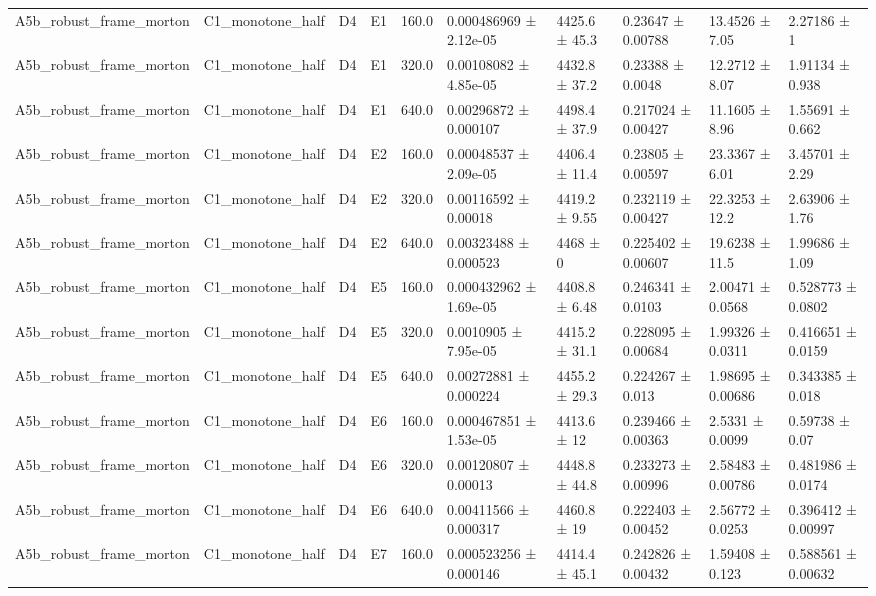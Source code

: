 \begin{table}
\begin{tabular}{llllllllll}
A5b\_robust\_frame\_morton & C1\_monotone\_half & D4 & E1 & 160.0 & 0.000486969 ± 2.12e-05 & 4425.6 ± 45.3 & 0.23647 ± 0.00788 & 13.4526 ± 7.05 & 2.27186 ± 1 \\
A5b\_robust\_frame\_morton & C1\_monotone\_half & D4 & E1 & 320.0 & 0.00108082 ± 4.85e-05 & 4432.8 ± 37.2 & 0.23388 ± 0.0048 & 12.2712 ± 8.07 & 1.91134 ± 0.938 \\
A5b\_robust\_frame\_morton & C1\_monotone\_half & D4 & E1 & 640.0 & 0.00296872 ± 0.000107 & 4498.4 ± 37.9 & 0.217024 ± 0.00427 & 11.1605 ± 8.96 & 1.55691 ± 0.662 \\
A5b\_robust\_frame\_morton & C1\_monotone\_half & D4 & E2 & 160.0 & 0.00048537 ± 2.09e-05 & 4406.4 ± 11.4 & 0.23805 ± 0.00597 & 23.3367 ± 6.01 & 3.45701 ± 2.29 \\
A5b\_robust\_frame\_morton & C1\_monotone\_half & D4 & E2 & 320.0 & 0.00116592 ± 0.00018 & 4419.2 ± 9.55 & 0.232119 ± 0.00427 & 22.3253 ± 12.2 & 2.63906 ± 1.76 \\
A5b\_robust\_frame\_morton & C1\_monotone\_half & D4 & E2 & 640.0 & 0.00323488 ± 0.000523 & 4468 ± 0 & 0.225402 ± 0.00607 & 19.6238 ± 11.5 & 1.99686 ± 1.09 \\
A5b\_robust\_frame\_morton & C1\_monotone\_half & D4 & E5 & 160.0 & 0.000432962 ± 1.69e-05 & 4408.8 ± 6.48 & 0.246341 ± 0.0103 & 2.00471 ± 0.0568 & 0.528773 ± 0.0802 \\
A5b\_robust\_frame\_morton & C1\_monotone\_half & D4 & E5 & 320.0 & 0.0010905 ± 7.95e-05 & 4415.2 ± 31.1 & 0.228095 ± 0.00684 & 1.99326 ± 0.0311 & 0.416651 ± 0.0159 \\
A5b\_robust\_frame\_morton & C1\_monotone\_half & D4 & E5 & 640.0 & 0.00272881 ± 0.000224 & 4455.2 ± 29.3 & 0.224267 ± 0.013 & 1.98695 ± 0.00686 & 0.343385 ± 0.018 \\
A5b\_robust\_frame\_morton & C1\_monotone\_half & D4 & E6 & 160.0 & 0.000467851 ± 1.53e-05 & 4413.6 ± 12 & 0.239466 ± 0.00363 & 2.5331 ± 0.0099 & 0.59738 ± 0.07 \\
A5b\_robust\_frame\_morton & C1\_monotone\_half & D4 & E6 & 320.0 & 0.00120807 ± 0.00013 & 4448.8 ± 44.8 & 0.233273 ± 0.00996 & 2.58483 ± 0.00786 & 0.481986 ± 0.0174 \\
A5b\_robust\_frame\_morton & C1\_monotone\_half & D4 & E6 & 640.0 & 0.00411566 ± 0.000317 & 4460.8 ± 19 & 0.222403 ± 0.00452 & 2.56772 ± 0.0253 & 0.396412 ± 0.00997 \\
A5b\_robust\_frame\_morton & C1\_monotone\_half & D4 & E7 & 160.0 & 0.000523256 ± 0.000146 & 4414.4 ± 45.1 & 0.242826 ± 0.00432 & 1.59408 ± 0.123 & 0.588561 ± 0.00632 \\

\end{tabular}
\end{table}
